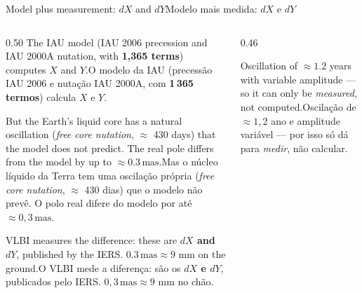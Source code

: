 \documentclass[aspectratio=169,11pt]{beamer}
\newcommand{\tr}[2]{\ifEN#2\else#1\fi}
\newcommand{\bnum}[1]{\textbf{\textcolor{mTeal}{#1}}}
\newcommand{\mas}{\ensuremath{\,\mathrm{mas}}\xspace}
\begin{document}
\begin{frame}{\tr{Modelo mais medida: $dX$ e $dY$}{Model plus measurement: $dX$ and $dY$}}
  \begin{columns}[T]
    \begin{column}{0.50\textwidth}
      \small
      \tr{O modelo da IAU (precessão IAU 2006 e nutação IAU 2000A, com \bnum{1\,365 termos}) calcula $X$ e $Y$.}{The IAU model (IAU 2006 precession and IAU 2000A nutation, with \bnum{1,365 terms}) computes $X$ and $Y$.}
      \medskip

      \tr{Mas o núcleo líquido da Terra tem uma oscilação própria (\emph{free core nutation}, $\approx$ 430 dias) que o modelo \alert{não prevê}. O polo real difere do modelo por até $\approx 0{,}3\mas$.}{But the Earth's liquid core has a natural oscillation (\emph{free core nutation}, $\approx$ 430 days) that the model \alert{does not predict}. The real pole differs from the model by up to $\approx 0.3\mas$.}
      \medskip

      \tr{O VLBI mede a diferença: são os \bnum{$dX$ e $dY$}, publicados pelo IERS. $0{,}3\mas \approx 9$ mm no chão.}{VLBI measures the difference: these are \bnum{$dX$ and $dY$}, published by the IERS. $0.3\mas \approx 9$ mm on the ground.}
    \end{column}
    \begin{column}{0.46\textwidth}
      \centering
      \par\smallskip
      {\scriptsize\textcolor{mStoneMid}{\tr{Oscilação de $\approx 1{,}2$ ano e amplitude variável --- por isso só dá para \emph{medir}, não calcular.}{Oscillation of $\approx 1.2$ years with variable amplitude --- so it can only be \emph{measured}, not computed.}}}
    \end{column}
  \end{columns}
\end{frame}
\end{document}
